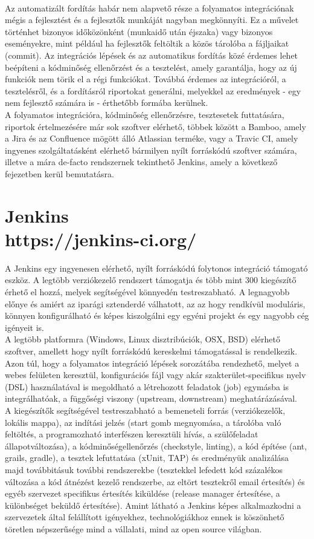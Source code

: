 \\
Az automatizált fordítás habár nem alapvető része a folyamatos integrációnak mégis a fejlesztést és a fejlesztők munkáját nagyban megkönnyíti. Ez a művelet történhet bizonyos időközönként (munkaidő után éjszaka) vagy bizonyos eseményekre, mint például ha fejlesztők feltöltik a közös tárolóba a fájljaikat (commit). Az integrációs lépések és az automatikus fordítás közé érdemes lehet beépíteni a kódminőség ellenőrzést és a tesztelést, amely garantálja, hogy az új funkciók nem törik el a régi funkciókat. Továbbá érdemes az integrációról, a tesztelésről, és a fordításról riportokat generálni, melyekkel az eredmények - egy nem fejlesztő számára is - érthetőbb formába kerülnek.
\\
A folyamatos integrációra, kódminőség ellenőrzésre, tesztesetek futtatására, riportok értelmezésére már sok szoftver elérhető, többek között a Bamboo, amely a Jira és az Confluence mögött álló Atlassian terméke, vagy a Travic CI, amely ingyenes szolgáltatásként elérhető bármilyen nyílt forráskódú szoftver számára, illetve a mára de-facto rendszernek tekinthető Jenkins, amely a következő fejezetben kerül bemutatásra.

\section{Jenkins\\\small{https://jenkins-ci.org/}}
A Jenkins egy ingyenesen elérhető, nyílt forráskódú folytonos integráció támogató eszköz. A legtöbb verziókezelő rendszert támogatja és több mint 300 kiegészítő érhető el hozzá, melyek segítségével könnyedén testreszabható. A legnagyobb előnye és amiért az iparági sztenderdé válhatott, az az hogy rendkívül moduláris, könnyen konfigurálható és képes kiszolgálni egy egyéni projekt és egy nagyobb cég igényeit is.\hfill\\
A legtöbb platformra (Windows, Linux disztribúciók, OSX, BSD) elérhető szoftver, amellett hogy nyílt forráskódú kereskelmi támogatással is rendelkezik.\hfill\\
Azon túl, hogy a folyamatos integráció lépések sorozátába rendezhető, melyet a webes felületen keresztül, konfigurációs fájl vagy akár szakterület-specifikus nyelv (DSL) használatával is megoldható a létrehozott feladatok (job) egymásba is integrálhatóak, a függőségi viszony (upstream, downstream) meghatárázásával.\hfill\\
A kiegészítők segítségével testreszabható a bemeneteli forrás (verziókezelők, lokális mappa), az indítási jelzés (start gomb megnyomása, a tárolóba való feltöltés, a programozható interfészen keresztüli hívás, a szülőfeladat állapotváltozása), a kódminőségellenőrzés (checkstyle, linting), a kód építése (ant, grails, gradle), a tesztek lefuttatása (xUnit, TAP) és eredményük analizálása majd továbbitásuk további rendszerekbe (tesztekkel lefedett kód százalékos változása a kód átnézést kezelő rendszerbe, az eltört tesztekről email értesítés) és egyéb szervezet specifikus értesítés kiküldése (release manager értesítése, a különbséget beküldő értesítése).
Amint látható a Jenkins képes alkalmazkodni a szervezetek által felállított igényekhez, technológiákhoz ennek is köszönhető töretlen népszerűsége mind a vállalati, mind az open source világban.

